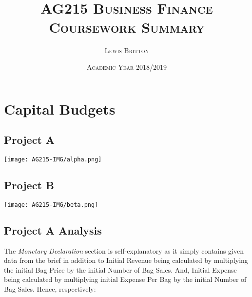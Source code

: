 \documentclass[11pt, english]{article}
\begin{document}

        \title{\textsc{AG215 Business Finance\\ Coursework Summary}}
        \author{\textsc{Lewis Britton}}
        \date{\textsc{Academic Year 2018/2019}}
        \maketitle

\newpage


        \renewcommand{\contentsname}{Table of Contents}

        \tableofcontents

\newpage


\section{Capital Budgets}

	\subsection{Project A}

	\begin{center}
                \texttt{[image: AG215-IMG/alpha.png]}
        \end{center}

	\subsection{Project B}
                                                       
        \begin{center}                                 
                \texttt{[image: AG215-IMG/beta.png]}
        \end{center}

	\subsection{Project A Analysis}

	The \textit{Monetary Declaration} section is self-explanatory as it simply contains given data from the brief in addition to Initial Revenue being calculated by multiplying the initial Bag Price by the initial Number of Bag Sales. And, Initial Expense being calculated by multiplying initial Expense Per Bag by the initial Number of Bag Sales. Hence, respectively:
\end{document}
